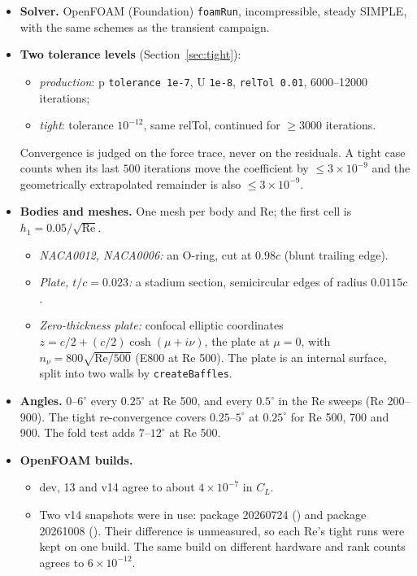 \documentclass[11pt,a4paper]{article}
\newcommand{\CL}{C_L}
\begin{document}
\begin{itemize}[leftmargin=*]
\item \textbf{Solver.} OpenFOAM (Foundation) \texttt{foamRun}, incompressible, steady SIMPLE, with the same
  schemes as the transient campaign.
\item \textbf{Two tolerance levels} (Section~\ref{sec:tight}):
  \begin{itemize}
  \item \emph{production}: p \texttt{tolerance 1e-7}, U \texttt{1e-8}, \texttt{relTol 0.01},
    6000--12000 iterations;
  \item \emph{tight}: tolerance $10^{-12}$, same relTol, continued for $\ge3000$ iterations.
  \end{itemize}
  Convergence is judged on the force trace, never on the residuals. A tight case counts when its last
  $500$ iterations move the coefficient by $\le3\times10^{-9}$ and the geometrically extrapolated
  remainder is also $\le3\times10^{-9}$.
\item \textbf{Bodies and meshes.} One mesh per body and Re; the first cell is
  $h_1 = 0.05/\sqrt{\mathrm{Re}}$.
  \begin{itemize}
  \item \emph{NACA0012, NACA0006:} an O-ring, cut at $0.98c$ (blunt trailing edge).
  \item \emph{Plate, $t/c=0.023$:} a stadium section, semicircular edges of radius $0.0115c$.
  \item \emph{Zero-thickness plate:} confocal elliptic coordinates $z = c/2 + (c/2)\cosh(\mu + i\nu)$, the
    plate at $\mu=0$, with $n_\nu = 800\sqrt{\mathrm{Re}/500}$ (E800 at Re 500). The plate is an internal
    surface, split into two walls by \texttt{createBaffles}.
  \end{itemize}
\item \textbf{Angles.} $0$--$6^\circ$ every $0.25^\circ$ at Re 500, and every $0.5^\circ$ in the Re sweeps
  (Re 200--900). The tight re-convergence covers $0.25$--$5^\circ$ at $0.25^\circ$ for Re 500, 700 and 900.
  The fold test adds $7$--$12^\circ$ at Re 500.
\item \textbf{OpenFOAM builds.}
  \begin{itemize}
  \item dev, 13 and v14 agree to about $4\times10^{-7}$ in $\CL$.
  \item Two v14 snapshots were in use: package 20260724 () and package 20261008
    (). Their difference is unmeasured, so each Re's tight runs were kept on one
    build. The same build on different hardware and rank counts agrees to $6\times10^{-12}$.
  \end{itemize}
\end{itemize}
\end{document}
